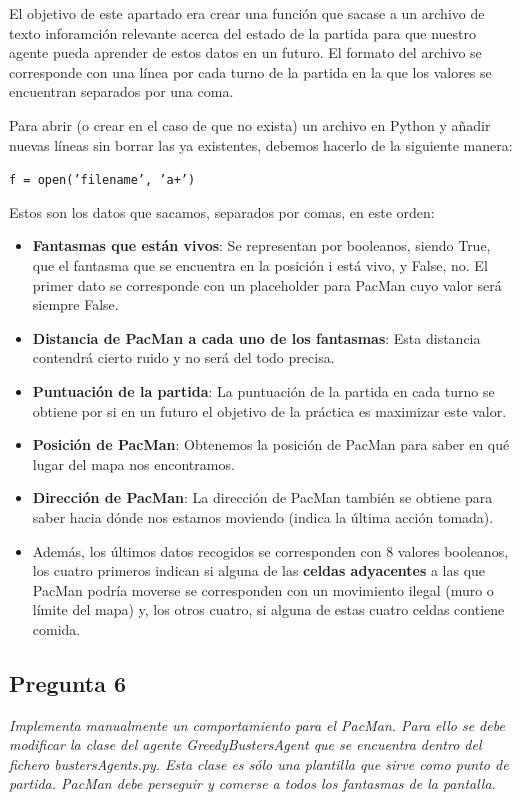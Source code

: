\documentclass[12pt]{article}
\begin{document}
El objetivo de este apartado era crear una función que sacase a un archivo de
texto inforamción relevante acerca del estado de la partida para que nuestro
agente pueda aprender de estos datos en un futuro. El formato del archivo se
corresponde con una línea por cada turno de la partida en la que los valores
se encuentran separados por una coma.

Para abrir (o crear en el caso de que no exista) un archivo en Python y añadir
nuevas líneas sin borrar las ya existentes, debemos hacerlo de la siguiente
manera:

\centerline{\texttt{f = open('filename', 'a+')}}

Estos son los datos que sacamos, separados por comas, en este orden:
\begin{itemize}
    \item \textbf{Fantasmas que están vivos}: Se representan por booleanos,
    siendo True, que el fantasma que se encuentra en la posición i está vivo, y
    False, no. El primer dato se corresponde con un placeholder para PacMan
    cuyo valor será siempre False.
    \item \textbf{Distancia de PacMan a cada uno de los fantasmas}: Esta
    distancia contendrá cierto ruido y no será del todo precisa.
    \item \textbf{Puntuación de la partida}: La puntuación de la partida en
    cada turno se obtiene por si en un futuro el objetivo de la práctica es
    maximizar este valor.
    \item \textbf{Posición de PacMan}: Obtenemos la posición de PacMan para
    saber en qué lugar del mapa nos encontramos.
    \item \textbf{Dirección de PacMan}: La dirección de PacMan también se
    obtiene para saber hacia dónde nos estamos moviendo (indica la última
    acción tomada).
    \item Además, los últimos datos recogidos se corresponden con 8 valores
    booleanos, los cuatro primeros indican si alguna de las \textbf{celdas
    adyacentes} a las que PacMan podría moverse se corresponden con un
    movimiento ilegal (muro o límite del mapa) y, los otros cuatro, si alguna
    de estas cuatro celdas contiene comida.
\end{itemize}


\newpage
\begin{center}
\subsection{Pregunta 6}

\emph{Implementa manualmente un comportamiento para el PacMan. Para ello se
debe modificar la clase del agente GreedyBustersAgent que se encuentra dentro
del fichero bustersAgents.py. Esta clase es sólo una plantilla que sirve como
punto de partida. PacMan debe perseguir y comerse a todos los fantasmas de la
pantalla.}
\end{center}
\end{document}
